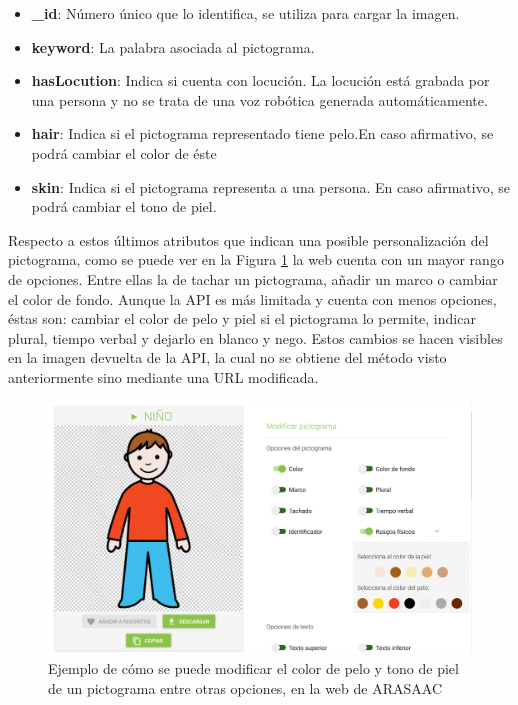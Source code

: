 \begin{itemize}
	\item \textbf{\_id}: Número único que lo identifica, se utiliza para cargar la imagen.
	
	\item \textbf{keyword}: La palabra asociada al pictograma.
	
	\item \textbf{hasLocution}: Indica si cuenta con locución. La locución está grabada por una persona y no se trata de una voz robótica generada automáticamente.
	
	\item \textbf{hair}: Indica si el pictograma representado tiene pelo.En caso afirmativo, se podrá cambiar el color de éste
	
	\item \textbf{skin}: Indica si el pictograma representa a una persona. En caso afirmativo, se podrá cambiar el tono de piel. 
	
\end{itemize}

Respecto a estos últimos atributos que indican una posible personalización del pictograma, como se puede ver en la Figura \ref{fig:colorespicto} la web cuenta con un mayor rango de opciones. Entre ellas la de tachar un pictograma, añadir un marco o cambiar el color de fondo. Aunque la API es más limitada y cuenta con menos opciones, éstas son: cambiar el color de pelo y piel si el pictograma  lo permite, indicar plural, tiempo verbal y dejarlo en blanco y nego. Estos cambios se hacen visibles en la imagen devuelta de la API, la cual no se obtiene del método visto anteriormente sino mediante una URL modificada. 

\begin{figure}[h!]
	\centering
	\includegraphics[width=0.7\linewidth]{Imagenes/Bitmap/coloresPicto}
	\caption{Ejemplo de cómo se puede modificar el color de pelo y tono de piel de un pictograma entre otras opciones, en la web de ARASAAC}
	\label{fig:colorespicto}
\end{figure}
